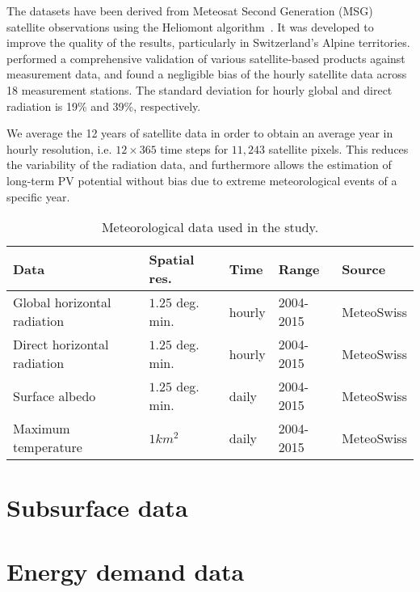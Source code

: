 The datasets have been derived from Meteosat Second Generation (MSG) satellite observations using the Heliomont algorithm~\cite{stockli_heliomont_2017}. It was developed to improve the quality of the results, particularly in Switzerland's Alpine territories. 
\citet{ineichen_long_2014} performed a comprehensive validation of various satellite-based products against measurement data, and found a negligible bias of the hourly satellite data across 18 measurement stations. 
The standard deviation for hourly global and direct radiation is 19\% and 39\%, respectively.

We average the 12 years of satellite data in order to obtain an average year in hourly resolution, i.e. $12 \times 365$ time steps for $11,243$ satellite pixels. This reduces the variability of the radiation data, and furthermore allows the estimation of long-term PV potential without bias due to extreme meteorological events of a specific year.

\begin{table}[tb]
\centering
\footnotesize
\begin{tabular}{lllll} %
\hline
\textbf{Data}               & \textbf{Spatial res.}        & \textbf{Time} & \textbf{Range} & \textbf{Source} \\
\hline 
Global horizontal radiation & $1.25$ deg. min.\footnotemark & hourly              & 2004-2015          &  MeteoSwiss \cite{stockli_daily_2013} \\
Direct horizontal radiation & $1.25$ deg. min.\footnotemark[\value{footnote}] & hourly              & 2004-2015          &  MeteoSwiss \cite{stockli_daily_2013} \\
Surface albedo              & $1.25$ deg. min.\footnotemark[\value{footnote}] & daily               & 2004-2015          &  MeteoSwiss \cite{stockli_daily_2013} \\
Maximum temperature         & $1 km^2$            & daily               & 2004-2015          &  MeteoSwiss \cite{meteoswiss_daily_2017} \\              
\hline
\end{tabular}
\caption{Meteorological data used in the study.}
\label{tab:meteo}
\end{table}


\section{Subsurface data}

\section{Energy demand data}
